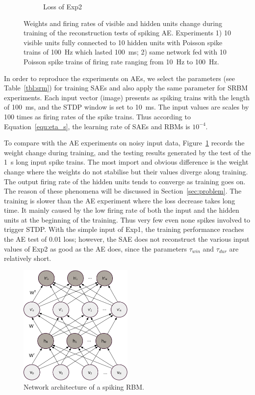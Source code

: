 \begin{figure}
\begin{subfigure}[t]{0.45\textwidth}
		\caption{Loss of Exp2}
	\end{subfigure}
	\caption{Weights and firing rates of visible and hidden units change during training of the reconstruction tests of spiking AE. 
		Experiments 1) 10 visible units fully connected to 10 hidden units with Poisson spike trains of 100~Hz which lasted 100~ms; 2) same network fed with 10 Poisson spike trains of firing rate ranging from 10~Hz to 100~Hz.}
	\label{fig:SAE_orig}
\end{figure}
In order to reproduce the experiments on AEs, we select the parameters (see Table~\ref{tbl:srm}) for training SAEs and also apply the same parameter for SRBM experiments.
Each input vector (image) presents as spiking trains with the length of 100~ms, and the STDP window is set to 10~ms.
The input values are scales by 100 times as firing rates of the spike trains.
Thus according to Equation~\ref{equ:eta_s}, the learning rate of SAEs and RBMs is $10^{-4}$.

To compare with the AE experiments on noisy input data, Figure~\ref{fig:SAE_orig} records the weight change during training, and the testing results generated by the test of the 1~s long input spike trains.
The most import and obvious difference is the weight change where the weights do not stabilise but their values diverge along training.
The output firing rate of the hidden units tends to converge as training goes on.
The reason of these phenomena will be discussed in Section~\ref{sec:problem}.
The training is slower than the AE experiment where the loss decrease takes long time.
It mainly caused by the low firing rate of both the input and the hidden units at the beginning of the training.
Thus very few even none spikes involved to trigger STDP.
With the simple input of Exp1, the training performance reaches the AE test of 0.01 loss;
however, the SAE does not reconstruct the various input values of Exp2 as good as the AE does, since the parameters $\tau_{win}$ and $\tau_{dur}$ are relatively short.

\begin{figure}
	\centering
	\includegraphics[width=0.5\textwidth]{pics_sdlm/rbm.pdf}
	\caption{Network architecture of a spiking RBM.}
	\label{fig:sRBM}
\end{figure}


